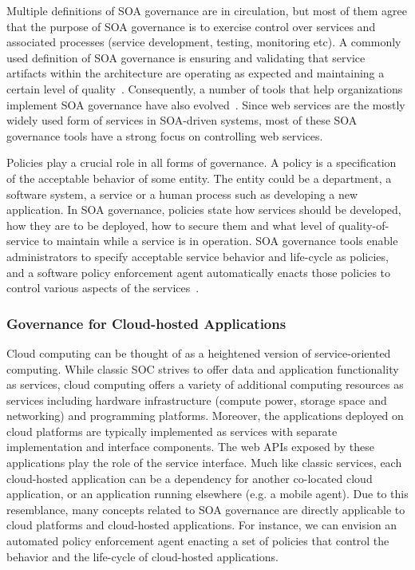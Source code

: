 Multiple definitions of SOA governance
are in circulation, but most of them agree that the purpose of SOA governance is to exercise control over
services and associated processes (service development, testing, monitoring etc). A commonly used definition
of SOA governance is ensuring and validating that service artifacts within the architecture are operating
as expected and maintaining a certain level of quality~\cite{gartner-soa-gov}.
Consequently, a number of tools that help organizations implement SOA governance 
have also evolved~\cite{Schepers:2008:LAS:1363686.1363932,4730489,6478236}.
Since web services are the mostly widely used form of services in SOA-driven systems, most of these
SOA governance tools have a strong focus on controlling web services. 

Policies play a crucial role in all forms of governance. A policy is a specification of the acceptable behavior
of some entity. The entity could be a department, a software system, a service or a 
human process such as developing
a new application. In SOA governance, policies state how services should be developed, how they are to be
deployed, how to secure them and what level of quality-of-service to maintain while a service is in operation.
SOA governance tools enable administrators to specify acceptable service behavior and life-cycle as policies, and
a software policy enforcement agent automatically enacts those policies to control various aspects of the 
services~\cite{5976827,4483228,4279691,5577268}. 

\subsubsection{Governance for Cloud-hosted Applications}
Cloud computing can be thought of as a heightened version of service-oriented computing. While classic
SOC strives to offer data and application functionality as services, cloud computing offers a variety
of additional computing resources
as services including hardware infrastructure (compute power, storage space and networking) and programming
platforms. Moreover, the applications deployed on cloud platforms are typically implemented as services with
separate implementation and interface components. The web APIs exposed by these applications play the
role of the service interface.
Much like classic services, each cloud-hosted application 
can be a dependency for another
co-located cloud application, or an application running elsewhere (e.g. a mobile agent). 
Due to this resemblance, many concepts related to SOA governance are
directly applicable to cloud platforms and cloud-hosted applications. For instance, we can envision an 
automated policy enforcement agent enacting a 
set of policies that control the behavior and the life-cycle of cloud-hosted applications.

